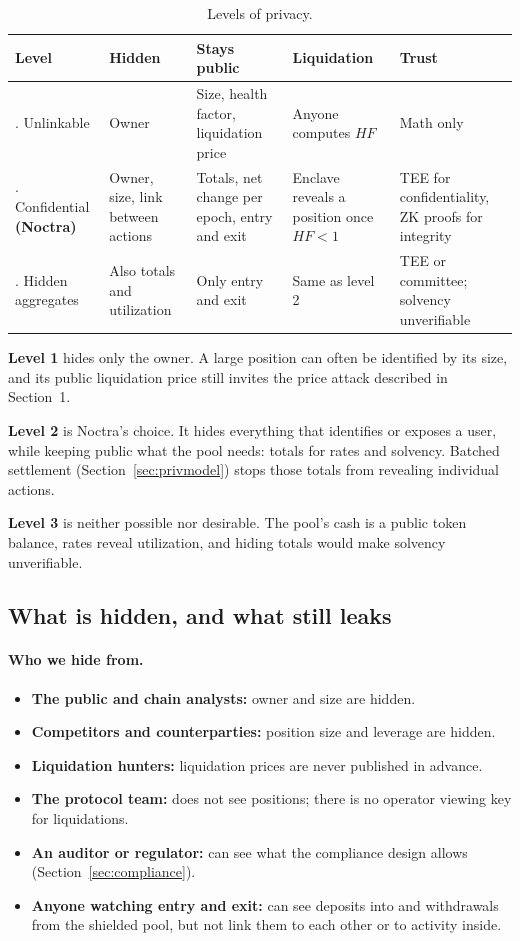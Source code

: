 \documentclass[11pt,a4paper]{article}
\begin{document}
\begin{table}[h]
\centering
\caption{Levels of privacy.}
\small
\begin{tabularx}{\textwidth}{@{}>{\raggedright\arraybackslash}p{2.3cm}LLLL@{}}
\toprule
Level & Hidden & Stays public & Liquidation & Trust \\
. Unlinkable & Owner & Size, health factor, liquidation price & Anyone computes $HF$ & Math only \\
. Confidential \textbf{(Noctra)} & Owner, size, link between actions & Totals, net change per epoch, entry and
  exit & Enclave reveals a position once $HF<1$ & TEE for confidentiality, ZK proofs for integrity \\
. Hidden aggregates & Also totals and utilization & Only entry and exit & Same as level 2 & TEE or committee;
  solvency unverifiable \\
\bottomrule
\end{tabularx}
\end{table}

\textbf{Level 1} hides only the owner. A large position can often be identified by its size, and its public
liquidation price still invites the price attack described in Section~1.

\textbf{Level 2} is Noctra's choice. It hides everything that identifies or exposes a user, while keeping public
what the pool needs: totals for rates and solvency. Batched settlement (Section~\ref{sec:privmodel}) stops those
totals from revealing individual actions.

\textbf{Level 3} is neither possible nor desirable. The pool's cash is a public token balance, rates reveal
utilization, and hiding totals would make solvency unverifiable.

\subsection{What is hidden, and what still leaks}

\paragraph{Who we hide from.}
\begin{itemize}
  \item \textbf{The public and chain analysts:} owner and size are hidden.
  \item \textbf{Competitors and counterparties:} position size and leverage are hidden.
  \item \textbf{Liquidation hunters:} liquidation prices are never published in advance.
  \item \textbf{The protocol team:} does not see positions; there is no operator viewing key for liquidations.
  \item \textbf{An auditor or regulator:} can see what the compliance design allows (Section~\ref{sec:compliance}).
  \item \textbf{Anyone watching entry and exit:} can see deposits into and withdrawals from the shielded pool, but
        not link them to each other or to activity inside.
\end{itemize}
\end{document}
